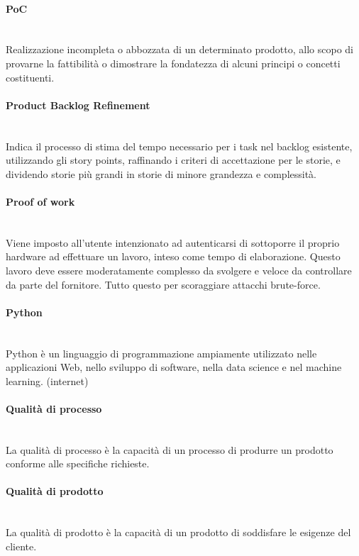 \paragraph{PoC}~\smallskip \\
Realizzazione incompleta o abbozzata di un determinato prodotto, allo scopo di provarne la fattibilità o dimostrare la fondatezza di alcuni principi o concetti costituenti.

\paragraph{Product Backlog Refinement}~\smallskip \\
Indica il processo di stima del tempo necessario per i task nel backlog esistente, utilizzando gli story points, 
raffinando i criteri di accettazione per le storie, e dividendo storie più grandi in storie di minore grandezza e complessità.

\paragraph{Proof of work}~\smallskip \\
Viene imposto all'utente intenzionato ad autenticarsi di sottoporre il proprio hardware ad effettuare un lavoro, inteso come tempo di elaborazione. Questo lavoro deve essere moderatamente complesso da svolgere e veloce da controllare da parte del fornitore. Tutto questo per scoraggiare attacchi brute-force.

\paragraph{Python}~\smallskip \\
Python è un linguaggio di programmazione ampiamente utilizzato nelle applicazioni Web, nello sviluppo di software, nella data science e nel machine learning. (internet)

\paragraph{Qualità di processo}~\smallskip \\
La qualità di processo è la capacità di un processo di produrre un prodotto conforme alle specifiche richieste.

\paragraph{Qualità di prodotto}~\smallskip \\
La qualità di prodotto è la capacità di un prodotto di soddisfare le esigenze del cliente.

